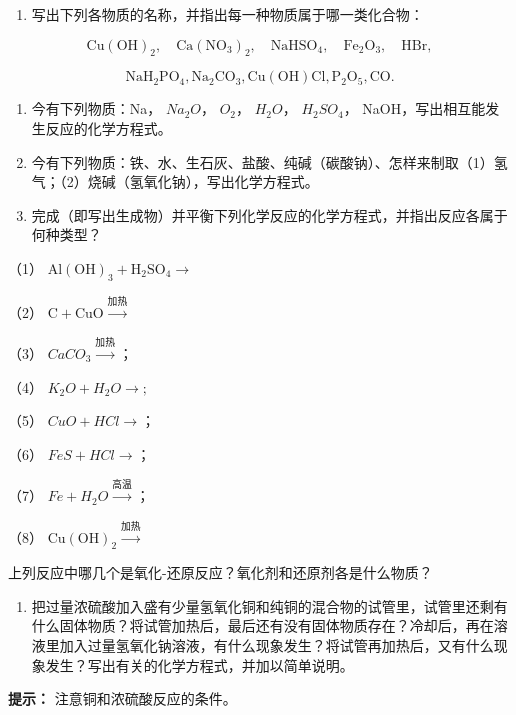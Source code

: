 \begin{enumerate}[start=7]
\item
  写出下列各物质的名称，并指出每一种物质属于哪一类化合物：
\end{enumerate}

\[
\mathrm{Cu} (\mathrm{OH}) _ {2}, \quad \mathrm{Ca} (\mathrm{NO}_{3}) _ {2}, \quad \mathrm{NaHSO}_{4}, \quad \mathrm{Fe}_{2} \mathrm{O}_{3}, \quad \mathrm{HBr},
\]

\[
\mathrm{NaH}_{2} \mathrm{PO}_{4}, \mathrm{Na}_{2} \mathrm{CO}_{3}, \mathrm{Cu(OH)} \mathrm{Cl}, \mathrm{P}_{2} \mathrm{O}_{5}, \mathrm{CO}.
\]

\begin{enumerate}[start=8]
\item
  今有下列物质：Na， \(Na_{2}O\)， \(O_{2}\)， \(H_{2}O\)，
  \(H_{2}SO_{4}\)， NaOH，写出相互能发生反应的化学方程式。
\item
  今有下列物质：铁、水、生石灰、盐酸、纯碱（碳酸钠）、怎样来制取（1）氢气；（2）烧碱（氢氧化钠），写出化学方程式。
\item
  完成（即写出生成物）并平衡下列化学反应的化学方程式，并指出反应各属于何种类型？
\end{enumerate}

（1） \(\mathrm{Al(OH)}_3 + \mathrm{H}_2\mathrm{SO}_4\longrightarrow\)

（2） \(\mathrm{C} + \mathrm{CuO}\xrightarrow{\text{加热}}\)

（3） \(CaCO_{3}\xrightarrow{\text{加热}}\)；

（4） \(K_{2}O+H_{2}O\longrightarrow;\)

（5） \(CuO + HCl \rightarrow\)；

（6） \(FeS + HCl \rightarrow\)；

（7） \(Fe + H_{2}O \xrightarrow{\text{高温}}\)；

（8） \(\mathrm{Cu(OH)}_{2}\xrightarrow{\text{加热}}\)

上列反应中哪几个是氧化-还原反应？氧化剂和还原剂各是什么物质？

\begin{enumerate}[start=11]
\item
  把过量浓硫酸加入盛有少量氢氧化铜和纯铜的混合物的试管里，试管里还剩有什么固体物质？将试管加热后，最后还有没有固体物质存在？冷却后，再在溶液里加入过量氢氧化钠溶液，有什么现象发生？将试管再加热后，又有什么现象发生？写出有关的化学方程式，并加以简单说明。
\end{enumerate}

\begin{shulihuadef}
\textbf{提示：} 注意铜和浓硫酸反应的条件。
\end{shulihuadef}

